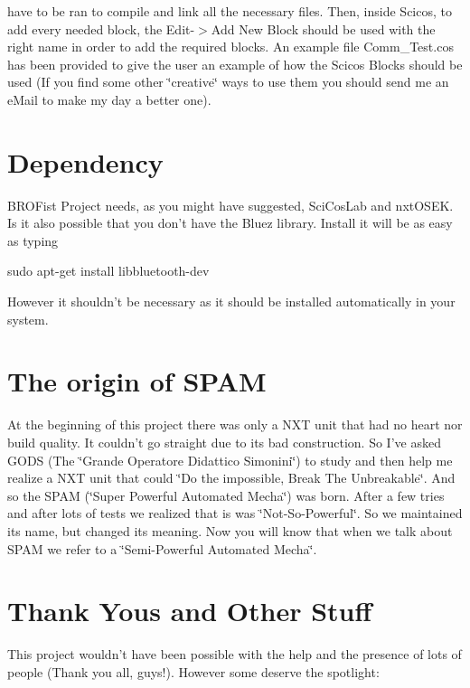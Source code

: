 have to be ran to compile and link all the necessary files. Then, inside Scicos, to add every needed block, the Edit-\/$>$Add New Block should be used with the right name in order to add the required blocks. An example file {\ttfamily Comm\_\-Test.cos} has been provided to give the user an example of how the Scicos Blocks should be used (If you find some other \char`\"{}creative\char`\"{} ways to use them you should send me an eMail to make my day a better one).\hypertarget{main_Dependency}{}\section{Dependency}\label{main_Dependency}
BROFist Project needs, as you might have suggested, SciCosLab and nxtOSEK. Is it also possible that you don't have the Bluez library. Install it will be as easy as typing \begin{DoxyVerb}
sudo apt-get install libbluetooth-dev
\end{DoxyVerb}
 However it shouldn't be necessary as it should be installed automatically in your system.\hypertarget{main_WhatSPAM}{}\section{The origin of SPAM}\label{main_WhatSPAM}
At the beginning of this project there was only a NXT unit that had no heart nor build quality. It couldn't go straight due to its bad construction. So I've asked GODS (The \char`\"{}Grande Operatore
       Didattico Simonini\char`\"{}) to study and then help me realize a NXT unit that could \char`\"{}Do the impossible, Break The Unbreakable\char`\"{}. And so the SPAM (\char`\"{}Super Powerful Automated Mecha\char`\"{}) was born. After a few tries and after lots of tests we realized that is was \char`\"{}Not-\/So-\/Powerful\char`\"{}. So we maintained its name, but changed its meaning. Now you will know that when we talk about SPAM we refer to a \char`\"{}Semi-\/Powerful Automated Mecha\char`\"{}.\hypertarget{main_Thanks}{}\section{Thank Yous and Other Stuff}\label{main_Thanks}
This project wouldn't have been possible with the help and the presence of lots of people (Thank you all, guys!). However some deserve the spotlight:


